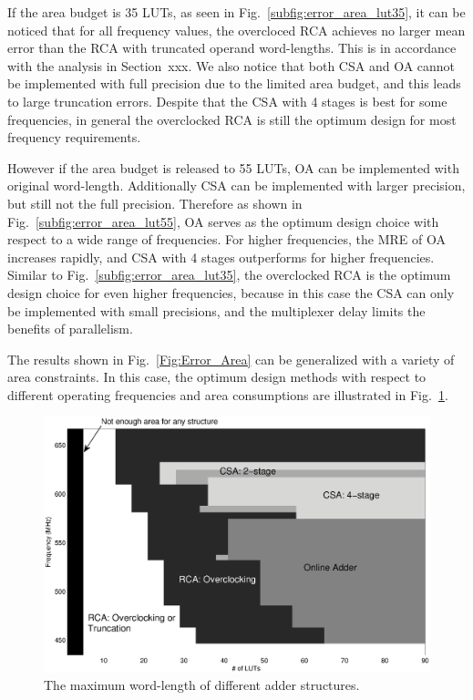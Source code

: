 \documentclass[10pt, conference, compsocconf]{IEEEtran}
\begin{document}
If the area budget is 35 LUTs, as seen in Fig.~\ref{subfig:error_area_lut35}, it can be noticed that for all frequency values, the overcloced RCA achieves no larger mean error than the RCA with truncated operand word-lengths. This is in accordance with the analysis in Section~xxx. We also notice that both CSA and OA cannot be implemented with full precision due to the limited area budget, and this leads to large truncation errors. Despite that the CSA with 4 stages is best for some frequencies, in general the overclocked RCA is still the optimum design for most frequency requirements.  

However if the area budget is released to 55 LUTs, OA can be implemented with original word-length. Additionally CSA can be implemented with larger precision, but still not the full precision. Therefore as shown in Fig.~\ref{subfig:error_area_lut55}, OA serves as the optimum design choice with respect to a wide range of frequencies. For higher frequencies, the MRE of OA increases rapidly, and CSA with 4 stages outperforms for higher frequencies. Similar to Fig.~\ref{subfig:error_area_lut35}, the overclocked RCA is the optimum design choice for even higher frequencies, because in this case the CSA can only be implemented with small precisions, and the multiplexer delay limits the benefits of parallelism.

The results shown in Fig.~\ref{Fig:Error_Area} can be generalized with a variety of area constraints. In this case, the optimum design methods with respect to different operating frequencies and area consumptions are illustrated in Fig.~\ref{Fig:adder_3d_FreqArea}. 
%
\begin{figure}[tbp]
  \centering
  \includegraphics[width=.8\textwidth]{./figures/exp/3d_FreqArea.eps}
  \caption{The maximum word-length of different adder structures.}
  \label{Fig:adder_3d_FreqArea}
\end{figure}
\end{document}
